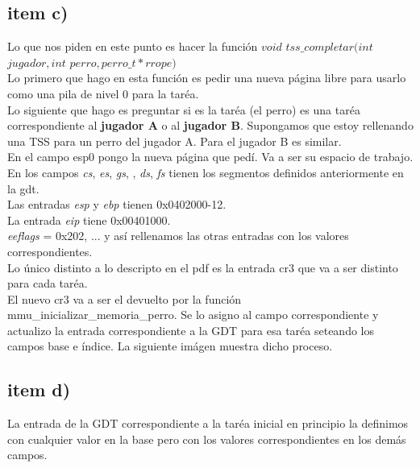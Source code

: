 \subsection{item c)}
Lo que nos piden en este punto es hacer la función $void$ $tss\_completar(int$ $jugador, int$ $perro, perro\_t *rrope)$\\
Lo primero que  hago en esta función es pedir una nueva página libre para usarlo como una pila de nivel 0 para la taréa.\\
Lo siguiente que hago es preguntar si es la taréa (el perro) es una taréa correspondiente al \textbf{jugador A} o al \textbf{jugador B}. Supongamos que estoy rellenando una TSS para un perro del jugador A. Para el jugador B es similar.\\
En el campo esp0 pongo la nueva página que pedí. Va a ser su espacio de trabajo.\\
En los campos \textit{cs}, \textit{es}, \textit{gs}, , \textit{ds}, \textit{fs} tienen los segmentos definidos anteriormente en la gdt.\\
Las entradas \textit{esp} y \textit{ebp} tienen 0x0402000-12.\\
La entrada \textit{eip} tiene 0x00401000.\\
\textit{eeflags} = 0x202, ... y así rellenamos las otras entradas con los valores correspondientes.\\
Lo único distinto a lo descripto en el pdf es la entrada cr3 que va a ser distinto para cada taréa.\\
El nuevo cr3 va a ser el devuelto por la función mmu\_inicializar\_memoria\_perro. Se lo asigno al campo correspondiente y actualizo la entrada correspondiente a la GDT para esa taréa seteando los campos base e índice.
La siguiente imágen muestra dicho proceso.\	\

\subsection{item d)}

La entrada de la GDT correspondiente a la taréa inicial en principio la definimos con cualquier 
valor  en la base pero con los valores correspondientes en los demás campos.

